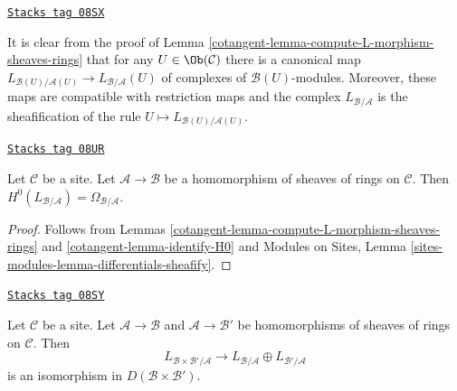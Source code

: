 \begin{remark}
\label{cotangent-remark-map-sections-over-U}
\href{https://stacks.math.columbia.edu/tag/08SX}{\texttt{Stacks tag 08SX}}

It is clear from the proof of
Lemma \ref{cotangent-lemma-compute-L-morphism-sheaves-rings}
that for any $U \in \Ob(\mathcal{C})$ there is a canonical map
$L_{\mathcal{B}(U)/\mathcal{A}(U)} \to L_{\mathcal{B}/\mathcal{A}}(U)$
of complexes of $\mathcal{B}(U)$-modules. Moreover, these maps
are compatible with restriction maps and the complex
$L_{\mathcal{B}/\mathcal{A}}$
is the sheafification of the rule $U \mapsto L_{\mathcal{B}(U)/\mathcal{A}(U)}$.
\end{remark}

\begin{lemma}
\label{cotangent-lemma-H0-L-morphism-sheaves-rings}
\href{https://stacks.math.columbia.edu/tag/08UR}{\texttt{Stacks tag 08UR}}

Let $\mathcal{C}$ be a site. Let $\mathcal{A} \to \mathcal{B}$ be a
homomorphism of sheaves of rings on $\mathcal{C}$. Then
$H^0(L_{\mathcal{B}/\mathcal{A}}) = \Omega_{\mathcal{B}/\mathcal{A}}$.
\end{lemma}

\begin{proof}

Follows from Lemmas \ref{cotangent-lemma-compute-L-morphism-sheaves-rings}
and \ref{cotangent-lemma-identify-H0} and
Modules on Sites, Lemma \ref{sites-modules-lemma-differentials-sheafify}.
\end{proof}

\begin{lemma}
\label{cotangent-lemma-compute-L-product-sheaves-rings}
\href{https://stacks.math.columbia.edu/tag/08SY}{\texttt{Stacks tag 08SY}}

Let $\mathcal{C}$ be a site. Let $\mathcal{A} \to \mathcal{B}$
and $\mathcal{A} \to \mathcal{B}'$ be homomorphisms of sheaves of rings
on $\mathcal{C}$. Then
$$
L_{\mathcal{B} \times \mathcal{B}'/\mathcal{A}}
\longrightarrow
L_{\mathcal{B}/\mathcal{A}} \oplus L_{\mathcal{B}'/\mathcal{A}}
$$
is an isomorphism in $D(\mathcal{B} \times \mathcal{B}')$.
\end{lemma}

